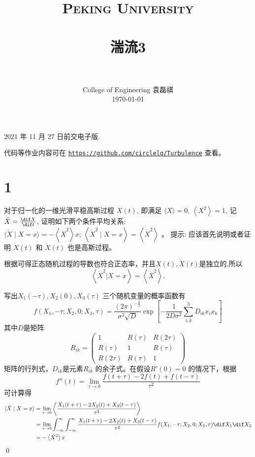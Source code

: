 \documentclass[12pt,a4]{ctexart}
\title{
   \vspace{-1in}
   \usefont{OT1}{bch}{b}{n}
   \normalfont \normalsize \textsc{\LARGE Peking University}\\[1cm] %
   \horrule{0.5pt} \\[0.5cm]
   \huge \bfseries{湍流3} \\
   \horrule{2pt} \\[0.5cm]
}
\author{
   \normalfont									\normalsize
   College of Engineering \quad 2001111690  \quad 袁磊祺\\	\normalsize
   \today
}
\date{}
\begin{document}


\maketitle

2021 年 11 月 27 日前交电子版.

代码等作业内容可在 \texttt{\href{https://github.com/circlelq/Turbulence}{https://github.com/circlelq/Turbulence}} 查看。


\section{1}


对于归一化的一维光滑平稳高斯过程 $X(t)$,  即满足 $\langle X\rangle=0,\, \left\langle X^{2}\right\rangle=1$, 记 $\dot{X}=\frac{\dif X}{\dif t}$, 证明如下两个条件平均关系: $\langle\ddot{X} \mid X=x\rangle=-\left\langle\dot{X}^{2}\right\rangle x ;\, \left\langle\dot{X}^{2} \mid X=x\right\rangle=\left\langle\dot{X}^{2}\right\rangle$ 。 提示: 应该首先说明或者证明 $\dot{X}(t)$ 和 $\ddot{X}(t)$ 也是高斯过程。

根据\cite[P45]{pan}可得正态随机过程的导数也符合正态率，并且$X(t),\dot{X}(t)$是独立的,所以
\begin{equation}
   \left< \dot{X}^2 \big| X = x \right> = \left< \dot{X}^2 \right>.
\end{equation}

写出$X_1(-\tau),X_2(0),X_3(\tau)$ 三个随机变量的概率函数有
\begin{equation}
   f(X_1,-\tau;X_2,0;X_3,\tau) = \frac{(2\pi)^{-\frac{3}{2}}}{\sigma^3\sqrt{D}}\exp \left[ - \frac{1}{2D\sigma^2} \sum_{i,k}^3 D_{ik} x_i x_k \right] 
\end{equation}
其中$D$是矩阵
\begin{equation}
   R_{ik} = 
   \begin{pmatrix} 
	  1 & R(\tau) & R(2\tau) \\
	  R(\tau) & 1 & R(\tau) \\
	  R(2\tau) & R(\tau) & 1
   \end{pmatrix} 
\end{equation}
矩阵的行列式，$D_{ik}$是元素$R_{ik}$ 的余子式。在假设$R'(0) = 0$ 的情况下，根据
\begin{equation}
   f''(t) = \lim_{\tau\to 0} \frac{f(t+\tau) - 2f(t) + f(t-\tau)}{\tau^2}
\end{equation}
可计算得
\begin{equation}
   \begin{aligned}
	  \langle\ddot{X} \mid X=x\rangle & = \lim_{\tau\to 0} \left<  \frac{X_{1}(t+\tau) - 2X_2(t) + X_3(t-\tau)}{\tau^2}	\right> \\
									  &= \lim_{\tau\to 0} \int_{-\infty}^{\infty} \int_{-\infty}^{\infty}  \frac{X_{1}(t+\tau) - 2X_2(t) + X_3(t-\tau)}{\tau^2} f(X_1,-\tau;X_2,0;X_3,\tau) \dif X_1 \dif X_3 \\
									  &= - \left< \dot{X}^2 \right> x \\
   \end{aligned}
\end{equation} \qed
\end{document}
